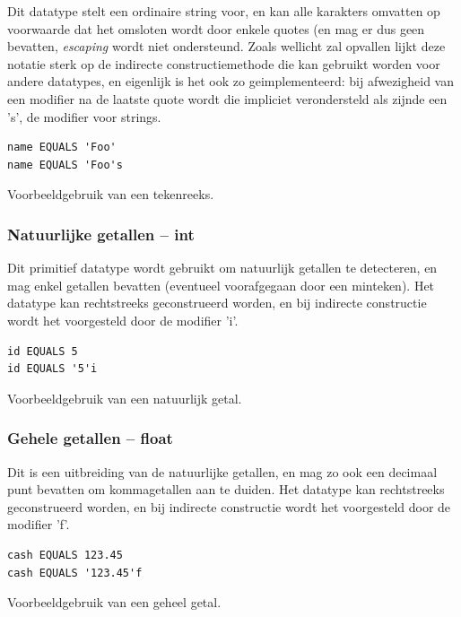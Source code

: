 Dit datatype stelt een ordinaire string voor, en kan alle karakters omvatten op voorwaarde dat het omsloten wordt door enkele quotes (en mag er dus geen bevatten, \emph{escaping} wordt niet ondersteund. Zoals wellicht zal opvallen lijkt deze notatie sterk op de indirecte constructiemethode die kan gebruikt worden voor andere datatypes, en eigenlijk is het ook zo geimplementeerd: bij afwezigheid van een modifier na de laatste quote wordt die impliciet verondersteld als zijnde een 's', de modifier voor strings.

\begin{code}
\begin{verbatim}
name EQUALS 'Foo'
name EQUALS 'Foo's
\end{verbatim}
\caption{Voorbeeldgebruik van een tekenreeks.}
\end{code}

\subsubsection{Natuurlijke getallen -- int}

Dit primitief datatype wordt gebruikt om natuurlijk getallen te detecteren, en mag enkel getallen bevatten (eventueel voorafgegaan door een minteken). Het datatype kan rechtstreeks geconstrueerd worden, en bij indirecte constructie wordt het voorgesteld door de modifier 'i'.

\begin{code}
\begin{verbatim}
id EQUALS 5
id EQUALS '5'i
\end{verbatim}
\caption{Voorbeeldgebruik van een natuurlijk getal.}
\end{code}

\subsubsection{Gehele getallen -- float}

Dit is een uitbreiding van de natuurlijke getallen, en mag zo ook een decimaal punt bevatten om kommagetallen aan te duiden. Het datatype kan rechtstreeks geconstrueerd worden, en bij indirecte constructie wordt het voorgesteld door de modifier 'f'.

\begin{code}
\begin{verbatim}
cash EQUALS 123.45
cash EQUALS '123.45'f
\end{verbatim}
\caption{Voorbeeldgebruik van een geheel getal.}
\end{code}

